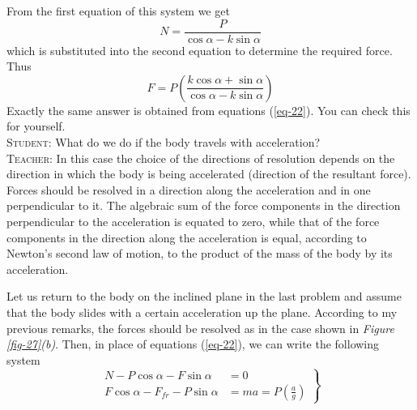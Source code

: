 \documentclass[a4paper,sfsidenotes]{tufte-book}
\begin{document}
From the first equation of this system we get
$$
N = \frac{P}{\cos \alpha -k \sin \alpha}
$$
which is substituted into the second equation to determine the required force. Thus
$$
F = P \left(\frac{k \cos \alpha + \sin \alpha }{\cos \alpha - k \sin \alpha}\right)
$$
Exactly the same answer is obtained from equations (\ref{eq-22}). You can check this for yourself.
\\
\textsc{Student:} What do we do if the body travels with acceleration?
\\
\textsc{Teacher:} In this case the choice of the directions of resolution depends on the direction in which the body is being accelerated (direction of the resultant force). Forces should be resolved in a direction along the acceleration and in one perpendicular to it. The algebraic sum of the force components in the direction perpendicular to the acceleration is equated to zero, while that of the force components in the direction along the acceleration is equal, according to Newton's second law of motion, to the product of the mass of the body by its acceleration.

Let us return to the body on the inclined plane in the last problem and assume that the body slides with a certain acceleration up the plane. According to my previous remarks, the forces should be resolved as in the case shown in \emph{Figure \ref{fig-27}(b)}. Then, in place of equations (\ref{eq-22}), we can write the following system
\begin{equation} 
\left.
\begin{split}
N  - P \cos \alpha -F \sin \alpha & = 0 \\
F \cos \alpha - F_{fr} - P \sin \alpha & = ma = P \left( \frac{a}{g} \right)
\label{eq-23}
\end{split}
\right\}
\end{equation}
\end{document}
